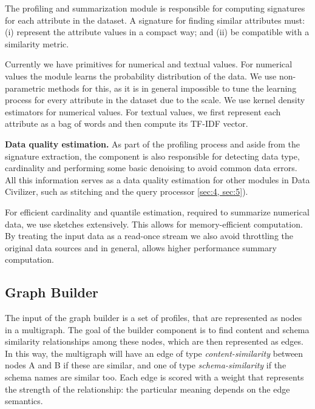 The profiling and summarization module is responsible for computing signatures
for each attribute in the dataset. A signature for finding similar attributes
must: (i) represent the attribute values in a compact way; and (ii) be
compatible with a similarity metric. 

Currently we have primitives for numerical and textual values. For numerical
values the module learns the probability distribution of the data. We use
non-parametric methods for this, as it is in general impossible to tune the
learning process for every attribute in the dataset due to the scale. We use
kernel density estimators for numerical values.  For textual values, we first
represent each attribute as a bag of words and then compute its TF-IDF vector.

\textbf{Data quality estimation.} As part of the profiling process and aside
from the signature extraction, the component is also responsible for detecting
data type, cardinality and performing some basic denoising to avoid common data
errors. All this information serves as a data quality estimation for other
modules in Data Civilizer, such as stitching and the query processor \ref{sec:4,
sec:5}). 

For efficient cardinality and quantile estimation, required to summarize
numerical data, we use sketches extensively. This allows for memory-efficient
computation. By treating the input data as a read-once stream we also avoid
throttling the original data sources and in general, allows higher performance
summary computation.

%

%

\subsection{Graph Builder} The input of the graph builder is a set of profiles,
that are represented as nodes in a multigraph. The goal of the builder component
is to find content and schema similarity relationships among these nodes, which
are then represented as edges. In this way, the multigraph will have an edge of
type \emph{content-similarity} between nodes A and B if these are similar, and
one of type \emph{schema-similarity} if the schema names are similar too. Each
edge is scored with a weight that represents the strength of the relationship:
the particular meaning depends on the edge semantics.

